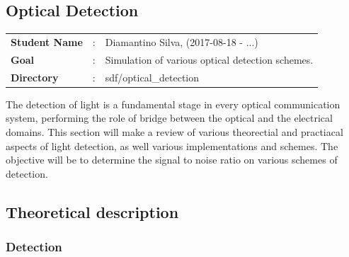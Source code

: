 \begin{bibunit}[plain]

\clearpage
\section{Optical Detection}

\begin{tcolorbox}	
\begin{tabular}{p{2.75cm} p{0.2cm} p{10.5cm}}
\textbf{Student Name}  &:& Diamantino Silva, (2017-08-18 - ...)\\
\textbf{Goal}          &:& Simulation of various optical detection schemes.\\
\textbf{Directory}     &:& sdf/optical\_detection
\end{tabular}
\end{tcolorbox}
%
\vspace{2em}
%
The detection of light is a fundamental stage in every optical communication system, performing the role of bridge between the optical and the electrical domains. This section will make a review of various theorectial and practiacal aspects of light detection, as well various implementations and schemes.
The objective will be to determine the signal to noise ratio on various schemes of detection.



\subsection{Theoretical description}\label{sec:intro}

\subsubsection{Detection}


\end{bibunit}
